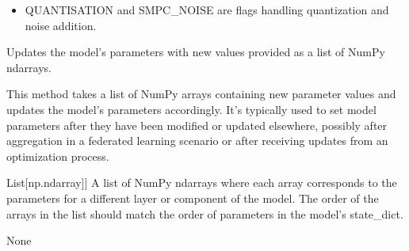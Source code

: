 \documentclass[letterpaper,10pt,english]{sphinxmanual}
\begin{document}
\begin{fulllineitems}
\begin{fulllineitems}
\begin{description}
\begin{itemize}
\item {} 
\sphinxAtStartPar
QUANTISATION and SMPC\_NOISE are flags handling quantization and noise addition.

\end{itemize}

\end{description}

\end{fulllineitems}


\begin{fulllineitems}
\label{\detokenize{insur_FL_client:insur_FL_client.ClaimsFrequencyFLClient.set_parameters}}
\pysigstartsignatures
{}
\pysigstopsignatures
\sphinxAtStartPar
Updates the model’s parameters with new values provided as a list of NumPy ndarrays.

\sphinxAtStartPar
This method takes a list of NumPy arrays containing new parameter values and updates the model’s
parameters accordingly. It’s typically used to set model parameters after they have been modified
or updated elsewhere, possibly after aggregation in a federated learning scenario or after receiving
updates from an optimization process.
\begin{description}
\begin{description}
\sphinxlineitem{parameters}{[}List{[}np.ndarray{]}{]}
\sphinxAtStartPar
A list of NumPy ndarrays where each array corresponds to the parameters for a different layer or
component of the model. The order of the arrays in the list should match the order of parameters
in the model’s state\_dict.

\end{description}

\sphinxAtStartPar
None


\end{description}
\end{fulllineitems}
\end{fulllineitems}
\end{document}
